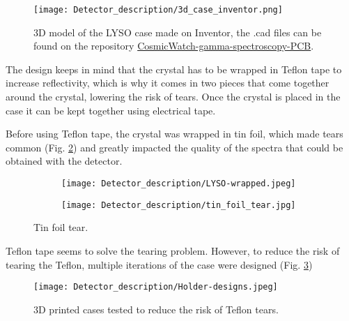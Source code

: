 \begin{figure}[H]
    \centering
    \texttt{[image: Detector\_description/3d\_case\_inventor.png]}
    \caption{3D model of the LYSO case made on Inventor, the .cad files can be found on the repository \href{https://github.com/anvargasl/CosmicWatch-gamma-spectroscopy-PCB}{CosmicWatch-gamma-spectroscopy-PCB}.}
    \label{fig:3d_case_desing}
\end{figure}

The design keeps in mind that the crystal has to be wrapped in Teflon tape to increase reflectivity, which is why it comes in two pieces that come together around the crystal, lowering the risk of tears. Once the crystal is placed in the case it can be kept together using electrical tape.

Before using Teflon tape, the crystal was wrapped in tin foil, which made tears common (Fig. \ref{fig:tin_foil_tear}) and greatly impacted the quality of the spectra that could be obtained with the detector. 

\begin{figure}[H]
    \centering
    \begin{subfigure}[t]{0.45\textwidth}
      \texttt{[image: Detector\_description/LYSO-wrapped.jpeg]}
    \end{subfigure}
    \begin{subfigure}[t]{0.45\textwidth}
      \texttt{[image: Detector\_description/tin\_foil\_tear.jpg]}
    \end{subfigure}
    \caption{\label{fig:tin_foil_tear}Tin foil tear.}
\end{figure}

Teflon tape seems to solve the tearing problem. However, to reduce the risk of tearing the Teflon, multiple iterations of the case were designed (Fig. \ref{fig:3d_previous_desings})

\begin{figure}[H]
    \centering
    \texttt{[image: Detector\_description/Holder-designs.jpeg]}
    \caption{3D printed cases tested to reduce the risk of Teflon tears.}
    \label{fig:3d_previous_desings}
\end{figure}
